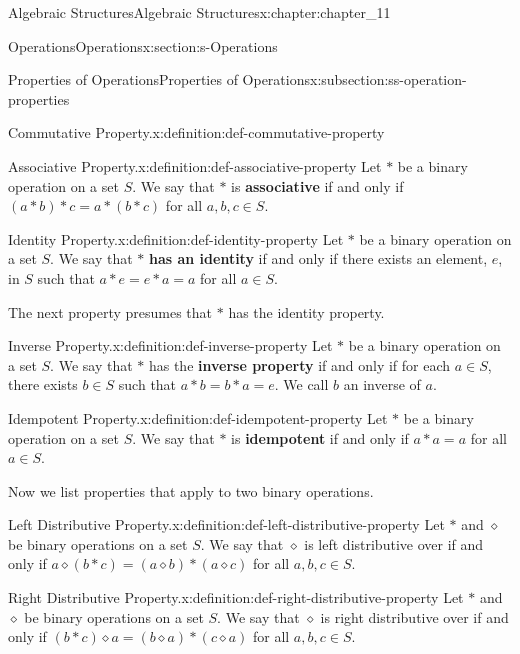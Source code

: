 \documentclass[twoside,10pt,]{book}
\newcommand{\terminology}[1]{\textbf{#1}}
\numberwithin{equation}{section}
\begin{document}
\begin{chapterptx}{Algebraic Structures}{}{Algebraic Structures}{}{}{x:chapter:chapter_11}
\begin{sectionptx}{Operations}{}{Operations}{}{}{x:section:s-Operations}
\begin{subsectionptx}{Properties of Operations}{}{Properties of Operations}{}{}{x:subsection:ss-operation-properties}
\begin{definition}{Commutative Property.}{x:definition:def-commutative-property}
\end{definition}
\begin{definition}{Associative Property.}{x:definition:def-associative-property}%
%
Let \(*\) be a binary operation on a set \(S\). We say that \(*\) is  \terminology{associative}  if and only if \((a * b) * c = a * (b * c)\) for all \(a, b, c \in  S\).%
\end{definition}
\begin{definition}{Identity Property.}{x:definition:def-identity-property}%
%
Let \(*\) be a binary operation on a set \(S\). We say that \(*\)   \terminology{has an identity} if and only if there exists an element, \(e\), in \(S\) such that \(a * e = e * a = a\) for all \(a \in S\).%
\end{definition}
The next property presumes that \(*\) has the identity property.%
\begin{definition}{Inverse Property.}{x:definition:def-inverse-property}%
%
Let \(*\) be a binary operation on a set \(S\). We say that \(*\)  has the  \terminology{inverse property}  if and only if for each \(a \in  S\), there exists  \(b \in  S\) such that \(a*b = b*a = e\).   We call \(b\) an inverse of \(a\).%
\end{definition}
\begin{definition}{Idempotent Property.}{x:definition:def-idempotent-property}%
%
Let \(*\) be a binary operation on a set \(S\). We say that \(*\)  is  \terminology{idempotent}  if and only if \(a * a = a\) for all \(a \in S\).%
\end{definition}
Now we list properties that apply to two binary operations.%
\begin{definition}{Left Distributive Property.}{x:definition:def-left-distributive-property}%
%
Let \(*\) and \(\diamond\) be  binary operations on a set \(S\). We say that \(\diamond\)  is left distributive over \textasteriskcentered{} if and only if \(a \diamond  (b * c) = (a \diamond  b) * (a \diamond  c)\) for all \(a,b,c\in S\).%
\end{definition}
\begin{definition}{Right Distributive Property.}{x:definition:def-right-distributive-property}%
%
Let \(*\) and \(\diamond\) be  binary operations on a set \(S\). We say that \(\diamond\)  is right distributive over \textasteriskcentered{} if and only if \((b * c)\diamond a = (b\diamond a) * (c \diamond  a)\) for all \(a,b,c\in S\).%

\end{definition}
\end{subsectionptx}
\end{sectionptx}
\end{chapterptx}
\end{document}
